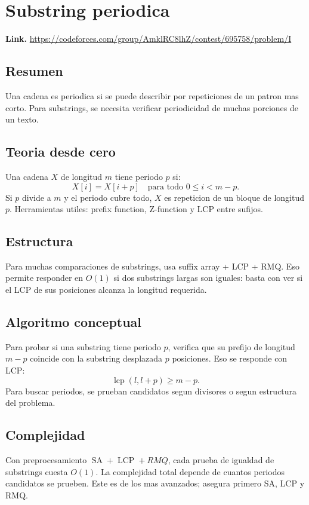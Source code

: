 \documentclass[10pt]{article}
\newcommand{\bigO}{O}
\newcommand{\SA}{\operatorname{SA}}
\newcommand{\LCP}{\operatorname{LCP}}
\begin{document}
\clearpage
\section{Substring periodica}
\textbf{Link.} \url{https://codeforces.com/group/AmklRC8lhZ/contest/695758/problem/I}

\subsection*{Resumen}
Una cadena es periodica si se puede describir por repeticiones de un patron mas
corto. Para substrings, se necesita verificar periodicidad de muchas porciones
de un texto.

\subsection*{Teoria desde cero}
Una cadena $X$ de longitud $m$ tiene periodo $p$ si:
\[
X[i]=X[i+p]\quad \text{para todo }0\le i<m-p.
\]
Si $p$ divide a $m$ y el periodo cubre todo, $X$ es repeticion de un bloque de
longitud $p$. Herramientas utiles: prefix function, Z-function y LCP entre
sufijos.

\subsection*{Estructura}
Para muchas comparaciones de substrings, usa suffix array + LCP + RMQ. Eso
permite responder en $\bigO(1)$ si dos substrings largas son iguales: basta con
ver si el LCP de sus posiciones alcanza la longitud requerida.

\subsection*{Algoritmo conceptual}
Para probar si una substring tiene periodo $p$, verifica que su prefijo de
longitud $m-p$ coincide con la substring desplazada $p$ posiciones. Eso se
responde con LCP:
\[
\operatorname{lcp}(l,l+p)\ge m-p.
\]
Para buscar periodos, se prueban candidatos segun divisores o segun estructura
del problema.

\subsection*{Complejidad}
Con preprocesamiento $\SA+\LCP+RMQ$, cada prueba de igualdad de substrings cuesta
$\bigO(1)$. La complejidad total depende de cuantos periodos candidatos se
prueben. Este es de los mas avanzados; asegura primero SA, LCP y RMQ.
\end{document}
